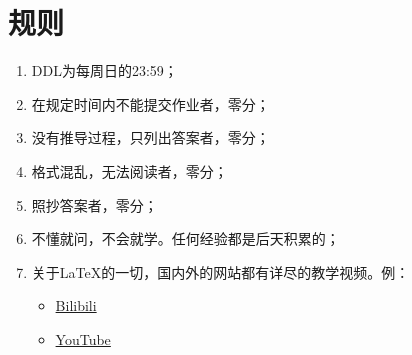 \documentclass[12pt,hyperref,a4paper,UTF8]{ctexart}
\begin{document}
\cover

%
%

\thispagestyle{empty} %

\newpage
\tableofcontents

\newpage


\section{规则}
\begin{enumerate}[I]
    \item DDL为每周日的23:59；
    
    \item 在规定时间内不能提交作业者，零分；

    \item 没有推导过程，只列出答案者，零分；

    \item 格式混乱，无法阅读者，零分；

    \item 照抄答案者，零分；

    \item 不懂就问，不会就学。任何经验都是后天积累的；

    \item 关于LaTeX的一切，国内外的网站都有详尽的教学视频。例：
    \begin{itemize}
        \item \href{https://www.bilibili.com/video/BV1Jy4y1p76e/?vd_source=2c0f6624843da61e86c7e8a2b75de875}{Bilibili}

        \item \href{https://www.youtube.com/watch?v=Jp0lPj2-DQA&list=PLHXZ9OQGMqxcWWkx2DMnQmj5os2X5ZR73}{YouTube}
    \end{itemize}
\end{enumerate}

\newpage

\end{document}
